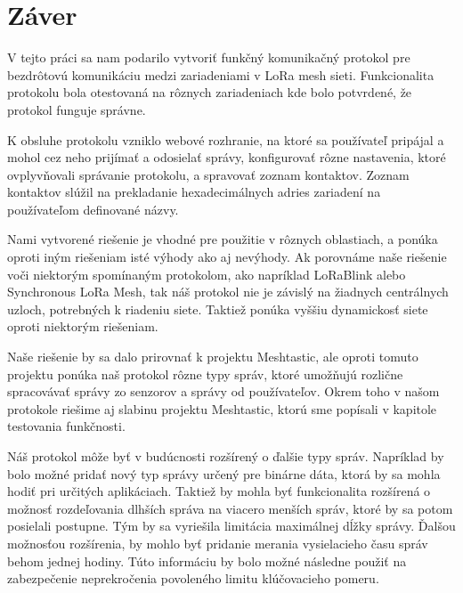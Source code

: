 \documentclass[slovak,master]{diploma}
\begin{document}
\chapter{Záver}
V tejto práci sa nam podarilo vytvoriť funkčný komunikačný protokol pre bezdrôtovú komunikáciu medzi zariadeniami v LoRa mesh sieti.
Funkcionalita protokolu bola otestovaná na rôznych zariadeniach kde bolo potvrdené, že protokol funguje správne. 

K obsluhe protokolu vzniklo webové rozhranie, na ktoré sa používateľ pripájal a mohol cez neho prijímať a odosielať správy, konfigurovať 
rôzne nastavenia, ktoré ovplyvňovali správanie protokolu, a spravovať zoznam kontaktov. Zoznam kontaktov slúžil na prekladanie 
hexadecimálnych adries zariadení na používateľom definované názvy.

Nami vytvorené riešenie je vhodné pre použitie v rôznych oblastiach, a ponúka oproti iným riešeniam isté výhody ako aj nevýhody.
Ak porovnáme naše riešenie voči niektorým spomínaným protokolom, ako napríklad LoRaBlink alebo Synchronous LoRa Mesh, 
tak náš protokol nie je závislý na žiadnych centrálnych uzloch, potrebných k riadeniu siete. Taktiež ponúka vyššiu dynamickosť siete oproti 
niektorým riešeniam.

Naše riešenie by sa dalo prirovnať k projektu Meshtastic, ale oproti tomuto projektu ponúka naš protokol rôzne typy správ, ktoré umožňujú 
rozlične spracovávať správy zo senzorov a správy od používateľov. Okrem toho v našom protokole riešime aj slabinu projektu Meshtastic, ktorú sme 
popísali v kapitole testovania funkčnosti.

Náš protokol môže byť v budúcnosti rozšírený o ďalšie typy správ. Napríklad by bolo možné pridať nový typ správy určený pre binárne dáta, 
ktorá by sa mohla hodiť pri určitých aplikáciach. 
Taktiež by mohla byť funkcionalita rozšírená o možnosť rozdeľovania dlhších správa na viacero menších správ, ktoré by sa potom posielali postupne. Tým by sa 
vyriešila limitácia maximálnej dĺžky správy. Ďalšou možnosťou rozšírenia, by mohlo byť pridanie merania vysielacieho času správ behom jednej hodiny. Túto informáciu 
by bolo možné následne použiť na zabezpečenie neprekročenia povoleného limitu klúčovacieho pomeru.

\printbibliography[title={Literatura}, heading=bibintoc]

\appendix
\chapter{}
\end{document}
